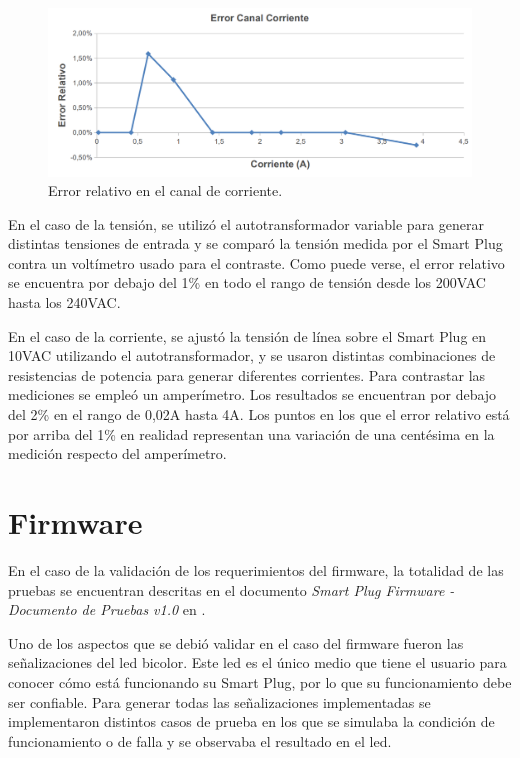 \begin{figure}[h]
	\centering
	\includegraphics[width=14cm]{./Figures/4_1_1_error_canal_corriente.png}
	\caption{Error relativo en el canal de corriente.}
	\label{fig:error_canal_corriente}
\end{figure}

En el caso de la tensión, se utilizó el autotransformador variable para generar distintas tensiones de entrada y se comparó la tensión medida por el Smart Plug contra un voltímetro usado para el contraste. Como puede verse, el error relativo se encuentra por debajo del 1\% en todo el rango de tensión desde los 200VAC hasta los 240VAC.

En el caso de la corriente, se ajustó la tensión de línea sobre el Smart Plug en 10VAC utilizando el autotransformador, y se usaron distintas combinaciones de resistencias de potencia para generar diferentes corrientes. Para contrastar las mediciones se empleó un amperímetro. Los resultados se encuentran por debajo del 2\% en el rango de 0,02A hasta 4A. Los puntos en los que el error relativo está por arriba del 1\% en realidad representan una variación de una centésima en la medición respecto del amperímetro.



\section{Firmware}
\label{sec:validacion_firmware}

En el caso de la validación de los requerimientos del firmware, la totalidad de las pruebas se encuentran descritas en el documento \textit{Smart Plug Firmware - Documento de Pruebas v1.0} en \citep{repo_docu_firmware}.

Uno de los aspectos que se debió validar en el caso del firmware fueron las señalizaciones del led bicolor. Este led es el único medio que tiene el usuario para conocer cómo está funcionando su Smart Plug, por lo que su funcionamiento debe ser confiable. Para generar todas las señalizaciones implementadas se implementaron distintos casos de prueba en los que se simulaba la condición de funcionamiento o de falla y se observaba el resultado en el led.

